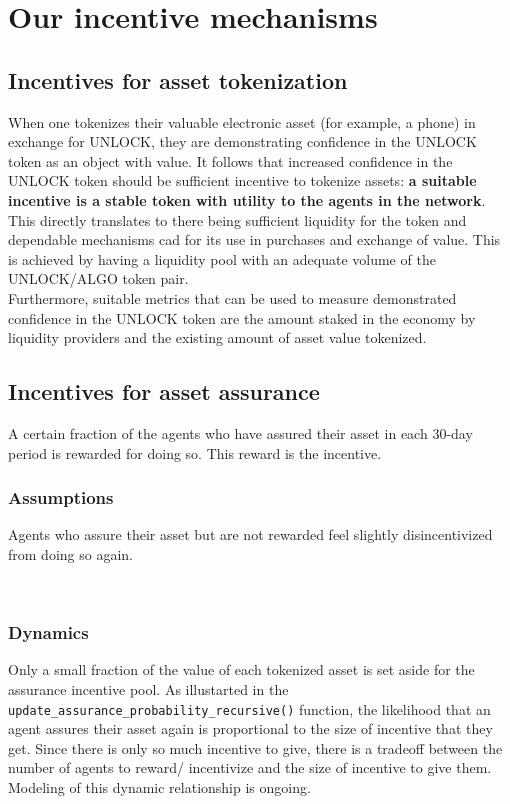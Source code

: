 \documentclass{article}
\begin{document}
\section{Our incentive mechanisms}
\subsection{Incentives for asset tokenization}
When one tokenizes their valuable electronic asset (for example, a phone) in exchange for UNLOCK, they are demonstrating confidence in the UNLOCK token as an object with value. It follows that increased confidence in the UNLOCK token should be sufficient incentive to tokenize assets: \textbf{a suitable incentive is a stable token with utility to the agents in the network}. \\

\noindent This directly translates to there being sufficient liquidity for the token and dependable mechanisms cad for its use in purchases and exchange of value. This is achieved by having a liquidity pool with an adequate volume of the UNLOCK/ALGO token pair. \\

\noindent Furthermore, suitable metrics that can be used to measure demonstrated confidence in the UNLOCK token are the amount staked in the economy by liquidity providers and the existing amount of asset value tokenized.

\subsection{Incentives for asset assurance}

A certain fraction of the agents who have assured their asset in each 30-day period is rewarded for doing so. This reward is the incentive.

\noindent \subsubsection*{Assumptions}
Agents who assure their asset but are not rewarded feel slightly disincentivized from doing so again.

\\
\noindent \subsubsection*{Dynamics}
Only a small fraction of the value of each tokenized asset is set aside for the assurance incentive pool. As illustarted in the \texttt{update\_assurance\_probability\_recursive()} function, the likelihood that an agent assures their asset again is proportional to the size of incentive that they get\cite{incentiveStructuresHülsemann}. Since there is only so much incentive to give, there is a tradeoff between the number of agents to reward/ incentivize and the size of incentive to give them. Modeling of this dynamic relationship is ongoing.
\end{document}
